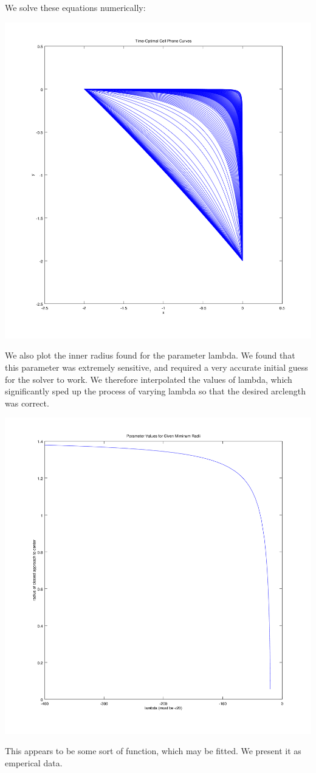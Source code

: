 \documentclass{article}
\begin{document}
We solve these equations numerically:

\includegraphics[width=1.3\textwidth]{time-optimal-curves.png}

We also plot the inner radius found for the parameter lambda.
We found that this parameter was extremely sensitive, and required a very
	accurate initial guess for the solver to work.
We therefore interpolated the values of lambda, which significantly
	sped up the process of varying lambda so that the desired 
	arclength was correct.

\includegraphics[width=\textwidth]{parameter-values.png}

This appears to be some sort of function, which may be fitted.
We present it as emperical data.
\end{document}
